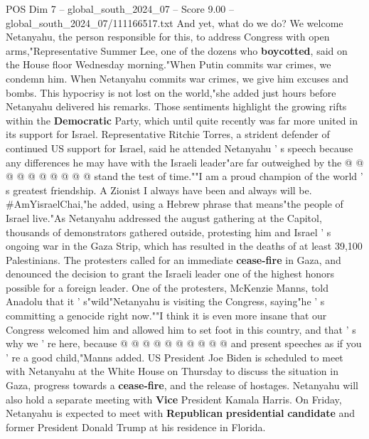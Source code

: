 \begin{textsample}{POS Dim 7 – global\_south\_2024\_07 – Score 9.00 – global\_south\_2024\_07/111166517.txt}
And yet, what do we do?
We welcome Netanyahu, the person responsible for this, to address Congress with open arms,"Representative Summer Lee, one of the dozens who \textbf{boycotted}, said on the House floor Wednesday morning."When Putin commits war crimes, we condemn him.
When Netanyahu commits war crimes, we give him excuses and bombs.
This hypocrisy is not lost on the world,"she added just hours before Netanyahu delivered his remarks.
Those sentiments highlight the growing rifts within the \textbf{Democratic} Party, which until quite recently was far more united in its support for Israel.
Representative Ritchie Torres, a strident defender of continued US support for Israel, said he attended Netanyahu ' s speech because any differences he may have with the Israeli leader"are far outweighed by the @ @ @ @ @ @ @ @ @ @ stand the test of time.""I am a proud champion of the world ' s greatest friendship.
A Zionist I always have been and always will be. \#AmYisraelChai,"he added, using a Hebrew phrase that means"the people of Israel live."As Netanyahu addressed the august gathering at the Capitol, thousands of demonstrators gathered outside, protesting him and Israel ' s ongoing war in the Gaza Strip, which has resulted in the deaths of at least 39,100 Palestinians.
The protesters called for an immediate \textbf{cease-fire} in Gaza, and denounced the decision to grant the Israeli leader one of the highest honors possible for a foreign leader.
One of the protesters, McKenzie Manns, told Anadolu that it ' s"wild"Netanyahu is visiting the Congress, saying"he ' s committing a genocide right now.""I think it is even more insane that our Congress welcomed him and allowed him to set foot in this country, and that ' s why we ' re here, because @ @ @ @ @ @ @ @ @ @ and present speeches as if you ' re a good child,"Manns added.
US President Joe Biden is scheduled to meet with Netanyahu at the White House on Thursday to discuss the situation in Gaza, progress towards a \textbf{cease-fire}, and the release of hostages.
Netanyahu will also hold a separate meeting with \textbf{Vice} President Kamala Harris.
On Friday, Netanyahu is expected to meet with \textbf{Republican} \textbf{presidential} \textbf{candidate} and former President Donald Trump at his residence in Florida.

\end{textsample}
